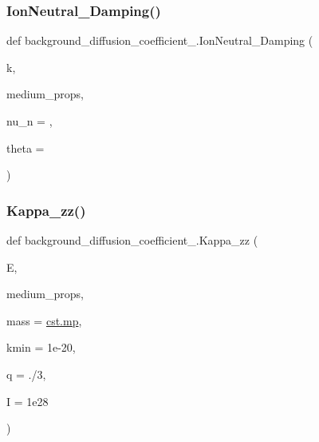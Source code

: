\subsubsection{\texorpdfstring{Ion\+Neutral\+\_\+\+Damping()}{IonNeutral\_Damping()}}
{\footnotesize\ttfamily def background\+\_\+diffusion\+\_\+coefficient\+\_.\+Ion\+Neutral\+\_\+\+Damping (\begin{DoxyParamCaption}\item[{}]{k,  }\item[{}]{medium\+\_\+props,  }\item[{}]{nu\+\_\+n = {},  }\item[{}]{theta = {} }\end{DoxyParamCaption})}

\mbox{\label{namespacebackground__diffusion__coefficient__3_a6fb6ea45313c3886a4b1d0d34fff498d}} 
\subsubsection{\texorpdfstring{Kappa\+\_\+zz()}{Kappa\_zz()}}
{\footnotesize\ttfamily def background\+\_\+diffusion\+\_\+coefficient\+\_.\+Kappa\+\_\+zz (\begin{DoxyParamCaption}\item[{}]{E,  }\item[{}]{medium\+\_\+props,  }\item[{}]{mass = {\ttfamily \hyperlink{constants_8h_a6b331c08a80ed71d31c55a3341776483}{cst.\+mp}},  }\item[{}]{kmin = {\ttfamily 1e-\/20},  }\item[{}]{q = {./3},  }\item[{}]{I = {\ttfamily 1e28} }\end{DoxyParamCaption})}

